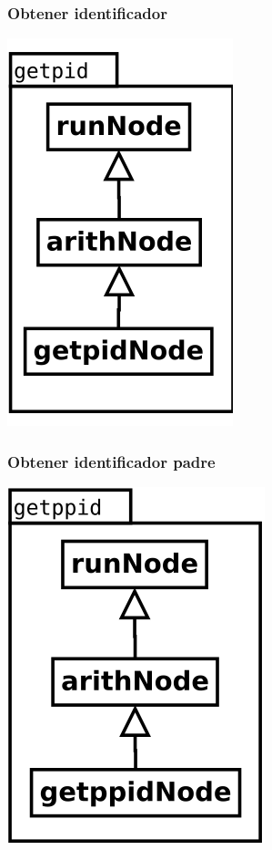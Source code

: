 \begin{multicols}{2}
   \subsubsection {Obtener identificador } 
   \begin{center}
   \includegraphics[scale=0.4]{getpid.png} \\
   \end{center}
\columnbreak
   \subsubsection {Obtener identificador padre} 
   \begin{center}
   \includegraphics[scale=0.4]{getppid.png} \\
   \end{center}
\end{multicols}


